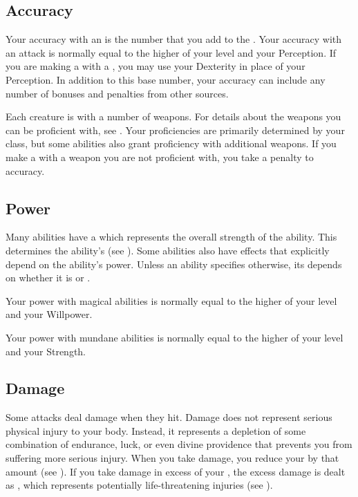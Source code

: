     \subsection{Accuracy}\label{Accuracy}
        Your accuracy with an  is the number that you add to the .
        Your accuracy with an attack is normally equal to the higher of your level and your Perception.
        If you are making a  with a , you may use your Dexterity in place of your Perception.
        In addition to this base number, your accuracy can include any number of bonuses and penalties from other sources.

         Each creature is  with a number of weapons.
        For details about the weapons you can be proficient with, see .
        Your proficiencies are primarily determined by your class, but some abilities also grant proficiency with additional weapons.
        If you make a  with a weapon you are not proficient with, you take a  penalty to accuracy.

    \subsection{Power}\label{Power}
        Many abilities have a  which represents the overall strength of the ability.
        This determines the ability's  (see ).
        Some abilities also have effects that explicitly depend on the ability's power.
        Unless an ability specifies otherwise, its  depends on whether it is  or .

        Your power with magical abilities is normally equal to the higher of your level and your Willpower.

        Your power with mundane abilities is normally equal to the higher of your level and your Strength.

    \subsection{Damage}\label{Damage}
        Some attacks deal damage when they hit.
        Damage does not represent serious physical injury to your body.
        Instead, it represents a depletion of some combination of endurance, luck, or even divine providence that prevents you from suffering more serious injury.
        When you take damage, you reduce your  by that amount (see ).
        If you take damage in excess of your , the excess damage is dealt as , which represents potentially life-threatening injuries (see ).

